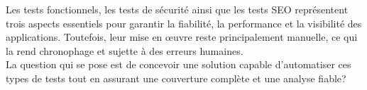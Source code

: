 Les tests fonctionnels, les tests de sécurité ainsi que les tests SEO représentent trois aspects essentiels pour garantir la fiabilité, la performance et la visibilité des applications. Toutefois, leur mise en œuvre reste principalement manuelle, ce qui la rend chronophage et sujette à des erreurs humaines. \\
La question qui se pose est de concevoir une solution capable d’automatiser ces types de tests tout en assurant une couverture complète et une analyse fiable?


